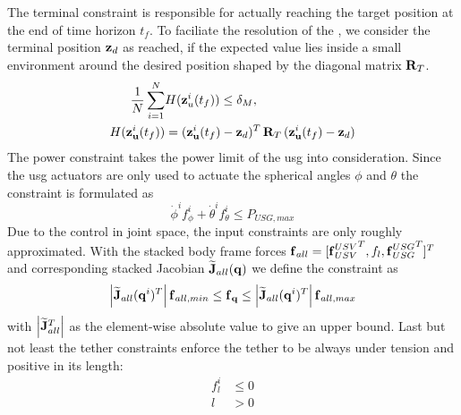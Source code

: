 \documentclass[a4paper,11pt]{article}
\newcommand{\Mat}[1]{\mathbf{\MakeUppercase{#1}}}
\renewcommand{\vec}[1]{\boldsymbol{\mathbf{\MakeLowercase{#1}}}}
\newcommand{\abs}[1]{\left|{#1}\right|}
\begin{document}
The terminal constraint is responsible for actually reaching the target position at the end of time horizon $t_f$. To faciliate the resolution of the  , we consider the terminal position $\vec{z}_d$ as reached, if the expected value lies inside a small environment around the desired position shaped by the diagonal matrix $\Mat{R}_T$. 
\begin{subequations}
	\begin{align}
	\frac{1}{N} \sum_{i=1}^{N} & {H}({\vec{z}}^i_u(t_f)) \leq \delta_M,
	\\
	{H}({\vec{z}}^i_{\vec{u}}(t_f)) &= (\vec{z}^i_{\vec{u}}(t_f) - \vec{z}_d)^T \, \Mat{R}_T \, (\vec{z}^i_{\vec{u}}(t_f) - \vec{z}_d)
	\end{align}
\end{subequations}
The power constraint takes the power limit of the \gls{usg} into consideration. Since the \gls{usg} actuators are only used to actuate the spherical angles $\phi$ and $\theta$ the constraint is formulated as
\begin{equation}
	\dot{\phi}^i f_{\phi}^i + \dot{\theta}^i f_{\theta}^i \le P_{USG, max}
\end{equation}
Due to the control in joint space, the input constraints are only roughly approximated. With the stacked body frame forces $\vec{f}_{all} = [{\vec{f}_{USV}^{USV}}^T, f_l, {\vec{f}_{USG}^{USG}}^T]^T$ and corresponding stacked Jacobian $\widetilde{\Mat{J}}_{all}(\vec{q})$ we define the constraint as
\begin{equation}
	\abs{\widetilde{\Mat{J}}_{all}(\vec{q}^i)^T} \vec{f}_{all, min} \le \vec{f}_{\vec{q}} \le  \abs{\widetilde{\Mat{J}}_{all}(\vec{q}^i)^T} \vec{f}_{all, max}
\end{equation}
with $ \abs{\widetilde{\Mat{J}}_{all}^T} $ as the element-wise absolute value to give an upper bound.
Last but not least the tether constraints enforce the tether to be always under tension and positive in its length:
\begin{align}
	f_l^i &\le 0
	\\
	l & > 0
\end{align}
\end{document}
